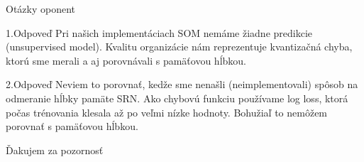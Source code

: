 \documentclass[10pt]{beamer}
\begin{document}
\begin{frame}{Otázky oponent}

  \begin{block}{1.Odpoveď } 
    Pri našich implementáciach SOM nemáme žiadne predikcie (unsupervised model).
    Kvalitu organizácie nám reprezentuje kvantizačná chyba, ktorú sme merali a aj porovnávali s pamäťovou hĺbkou.

  \end{block}

  \begin{block}{2.Odpoveď}
    Neviem to porovnať, kedže sme nenašli (neimplementovali) spôsob na odmeranie hĺbky pamäte SRN.
    Ako chybovú funkciu používame log loss, ktorá počas trénovania klesala až po veľmi nízke hodnoty. Bohužiaľ to nemôžem porovnať s pamäťovou hĺbkou.
  \end{block}


\end{frame}



{
\begin{frame}[standout]
  Ďakujem za pozornosť
\end{frame}
}

\appendix
\end{document}
